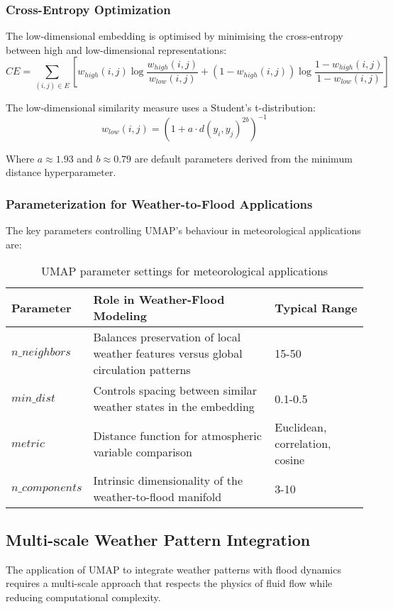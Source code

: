 \documentclass{article}
\begin{document}
\subsubsection{Cross-Entropy Optimization}
The low-dimensional embedding is optimised by minimising the cross-entropy between high and low-dimensional representations:
\begin{equation}
CE = \sum_{(i,j) \in E} \left[ w_{high}(i,j) \log \frac{w_{high}(i,j)}{w_{low}(i,j)} + (1 - w_{high}(i,j)) \log \frac{1 - w_{high}(i,j)}{1 - w_{low}(i,j)} \right]
\end{equation}

The low-dimensional similarity measure uses a Student's t-distribution:
\begin{equation}
w_{low}(i,j) = \left(1 + a \cdot d(y_i, y_j)^{2b}\right)^{-1}
\end{equation}

Where $a \approx 1.93$ and $b \approx 0.79$ are default parameters derived from the minimum distance hyperparameter.

\subsubsection{Parameterization for Weather-to-Flood Applications}
The key parameters controlling UMAP's behaviour in meteorological applications are:

\begin{table}[h]
\centering
\begin{tabular}{|l|p{9cm}|l|}
\hline
\textbf{Parameter} & \textbf{Role in Weather-Flood Modeling} & \textbf{Typical Range} \\
\hline
$n\_neighbors$ & Balances preservation of local weather features versus global circulation patterns & 15-50 \\
\hline
$min\_dist$ & Controls spacing between similar weather states in the embedding & 0.1-0.5 \\
\hline
$metric$ & Distance function for atmospheric variable comparison & Euclidean, correlation, cosine \\
\hline
$n\_components$ & Intrinsic dimensionality of the weather-to-flood manifold & 3-10 \\
\hline
\end{tabular}
\caption{UMAP parameter settings for meteorological applications}
\label{tab:umap_params}
\end{table}

\subsection{Multi-scale Weather Pattern Integration}
The application of UMAP to integrate weather patterns with flood dynamics requires a multi-scale approach that respects the physics of fluid flow while reducing computational complexity.
\end{document}
